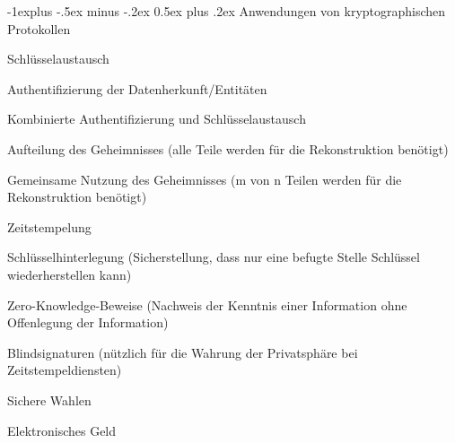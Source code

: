 \documentclass[a4paper]{article}
\makeatletter
\renewcommand{\subsection}{\@startsection{subsection}{2}{0mm}%
 {-1explus -.5ex minus -.2ex}%
 {0.5ex plus .2ex}%
 {\normalfont\normalsize\bfseries}}
\makeatother
\begin{document}
\begin{multicols}{3}
      \subsection{Anwendungen von kryptographischen Protokollen}
      \begin{itemize*}
            \item Schlüsselaustausch
            \item Authentifizierung der Datenherkunft/Entitäten
            \item Kombinierte Authentifizierung und Schlüsselaustausch
            \item Aufteilung des Geheimnisses (alle Teile werden für die Rekonstruktion benötigt)
            \item Gemeinsame Nutzung des Geheimnisses (m von n Teilen werden für die Rekonstruktion benötigt)
            \item Zeitstempelung
            \item Schlüsselhinterlegung (Sicherstellung, dass nur eine befugte Stelle Schlüssel wiederherstellen kann)
            \item Zero-Knowledge-Beweise (Nachweis der Kenntnis einer Information ohne Offenlegung der Information)
            \item Blindsignaturen (nützlich für die Wahrung der Privatsphäre bei Zeitstempeldiensten)
            \item Sichere Wahlen
            \item Elektronisches Geld
      \end{itemize*}


\end{multicols}
\end{document}
